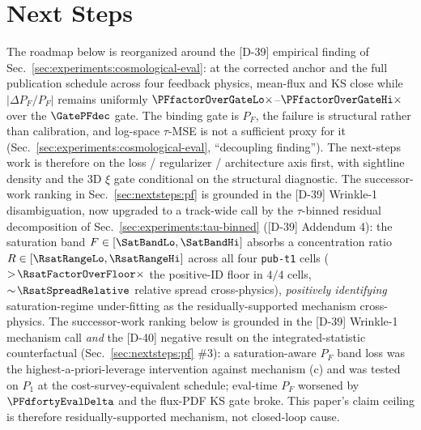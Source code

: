 \section{Next Steps}
\label{sec:nextsteps}

The roadmap below is reorganized around the [D-39] empirical finding of Sec.~\ref{sec:experiments:cosmological-eval}: at the corrected anchor and the full publication schedule across four feedback physics, mean-flux and KS close while $|\Delta P_F/P_F|$ remains uniformly $\PFfactorOverGateLo\times$--$\PFfactorOverGateHi\times$ over the $\GatePFdec$ gate. The binding gate is $P_F$, the failure is structural rather than calibration, and log-space $\tau$-MSE is not a sufficient proxy for it (Sec.~\ref{sec:experiments:cosmological-eval}, ``decoupling finding''). The next-steps work is therefore on the loss / regularizer / architecture axis first, with sightline density and the 3D $\xi$ gate conditional on the structural diagnostic. The successor-work ranking in Sec.~\ref{sec:nextsteps:pf} is grounded in the [D-39] Wrinkle-1 disambiguation, now upgraded to a track-wide call by the $\tau$-binned residual decomposition of Sec.~\ref{sec:experiments:tau-binned} ([D-39] Addendum 4): the saturation band $F \in [\SatBandLo, \SatBandHi]$ absorbs a concentration ratio $R \in [\RsatRangeLo, \RsatRangeHi]$ across all four \texttt{pub-t1} cells ($> \!\RsatFactorOverFloor\times$ the positive-ID floor in $4/4$ cells, $\sim\!\RsatSpreadRelative$ relative spread cross-physics), \emph{positively identifying} saturation-regime under-fitting as the residually-supported mechanism cross-physics. The successor-work ranking below is grounded in the [D-39] Wrinkle-1 mechanism call \emph{and} the [D-40] negative result on the integrated-statistic counterfactual (Sec.~\ref{sec:nextsteps:pf} \#3): a saturation-aware $P_F$ band loss was the highest-a-priori-leverage intervention against mechanism (c) and was tested on $P_1$ at the cost-survey-equivalent schedule; eval-time $P_F$ worsened by $\PFdfortyEvalDelta$ and the flux-PDF KS gate broke. This paper's claim ceiling is therefore residually-supported mechanism, not closed-loop cause.


